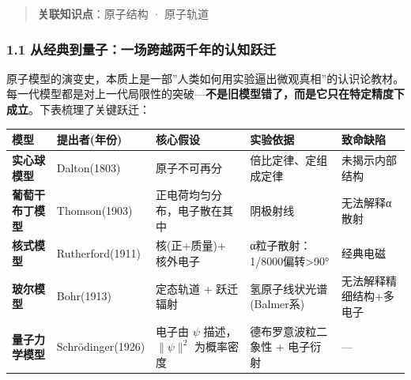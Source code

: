 \documentclass[a4paper,11pt]{ctexart}
\newcounter{none}
\newcommand{\箭}{\ensuremath{\rightarrow}}
\newcommand{\左箭}{\ensuremath{\leftarrow}}
\newcommand{\上箭}{\ensuremath{\uparrow}}
\newcommand{\下箭}{\ensuremath{\downarrow}}
\newcommand{\衡}{\ensuremath{\rightleftharpoons}}
\newcommand{\双箭}{\ensuremath{\leftrightarrow}}
\newcommand{\约等于}{\ensuremath{\approx}}
\newcommand{\小于等于}{\ensuremath{\leq}}
\newcommand{\大于等于}{\ensuremath{\geq}}
\newcommand{\不等于}{\ensuremath{\neq}}
\newcommand{\西格马}{\ensuremath{\sigma}}
\newcommand{\派}{\ensuremath{\pi}}
\begin{document}
\begin{quote}
\textbf{关联知识点}：原子结构 · 原子轨道
\end{quote}

\subsubsection{1.1 从经典到量子：一场跨越两千年的认知跃迁}\label{ux4eceux7ecfux5178ux5230ux91cfux5b50ux4e00ux573aux8de8ux8d8aux4e24ux5343ux5e74ux7684ux8ba4ux77e5ux8dc3ux8fc1}

原子模型的演变史，本质上是一部''人类如何用实验逼出微观真相''的认识论教材。每一代模型都是对上一代局限性的突破---\textbf{不是旧模型错了，而是它只在特定精度下成立}。下表梳理了关键跃迁：

{\def\LTcaptype{none} %
\begin{longtable}[]{@{}
  >{\raggedright\arraybackslash}p{}
  >{\raggedright\arraybackslash}p{}
  >{\raggedright\arraybackslash}p{}
  >{\raggedright\arraybackslash}p{}
  >{\raggedright\arraybackslash}p{}@{}}
\toprule\noalign{}
\begin{minipage}[b]{\linewidth}\raggedright
模型
\end{minipage} & \begin{minipage}[b]{\linewidth}\raggedright
提出者(年份)
\end{minipage} & \begin{minipage}[b]{\linewidth}\raggedright
核心假设
\end{minipage} & \begin{minipage}[b]{\linewidth}\raggedright
实验依据
\end{minipage} & \begin{minipage}[b]{\linewidth}\raggedright
致命缺陷
\end{minipage} \\
\midrule\noalign{}
\endhead
\bottomrule\noalign{}
\endlastfoot
\textbf{实心球模型} & Dalton(1803) & 原子不可再分 & 倍比定律、定组成定律 & 未揭示内部结构 \\
\textbf{葡萄干布丁模型} & Thomson(1903) & 正电荷均匀分布，电子散在其中 & 阴极射线 & 无法解释α散射 \\
\textbf{核式模型} & Rutherford(1911) & 核(正+质量)+ 核外电子 & α粒子散射：1/8000偏转\textgreater90° & 经典电磁 \\
\textbf{玻尔模型} & Bohr(1913) & 定态轨道 + 跃迁辐射 & 氢原子线状光谱(Balmer系) & 无法解释精细结构+多电子 \\
\textbf{量子力学模型} & Schrödinger(1926) & 电子由 \(\psi\) 描述，\(\|\psi\|^2\) 为概率密度 & 德布罗意波粒二象性 + 电子衍射 & --- \\
\end{longtable}
}
\end{document}
